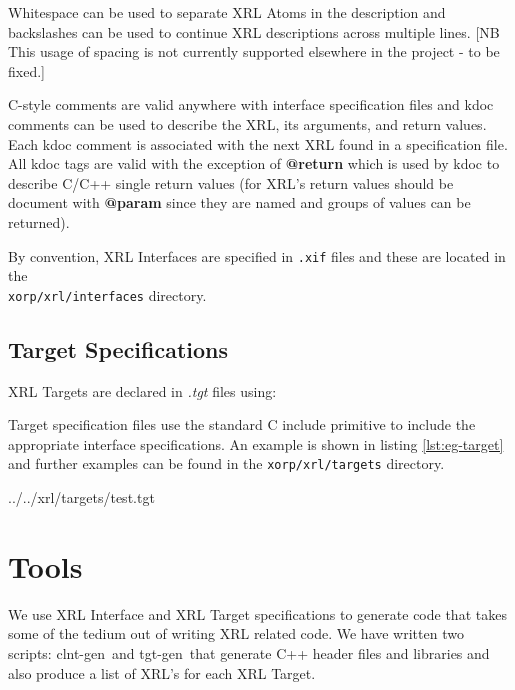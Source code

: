 \documentclass[11pt]{article}
\newcommand{\clntgen}{{\sf clnt-gen}~}
\newcommand{\tgtgen}{{\sf tgt-gen}~}
\begin{document}
 

Whitespace can be used to separate XRL Atoms in the description and
backslashes can be used to continue XRL descriptions across multiple
lines.  [NB This usage of spacing is not currently supported
elsewhere in the project - to be fixed.]

C-style comments are valid anywhere with interface specification files
and kdoc comments can be used to describe the XRL, its arguments, and
return values.  Each kdoc comment is associated with the next XRL
found in a specification file.  All kdoc tags are valid with the
exception of \textbf{@return} which is used by kdoc to describe C/C++
single return values (for XRL's return values should be document with
\textbf{@param} since they are named and groups of values can be
returned).

By convention, XRL Interfaces are specified in \texttt{.xif} files and these
are located in the \\
\texttt{xorp/xrl/interfaces} directory.

\subsection{Target Specifications}

XRL Targets are declared in \textit{.tgt} files using:

\smallskip
\noindent{}

\smallskip Target specification files use the standard C include
primitive to include the appropriate interface specifications.  An
example is shown in listing \ref{lst:eg-target} and further examples
can be found in the \texttt{xorp/xrl/targets} directory.

%
{../../xrl/targets/test.tgt}

\section{Tools}

We use XRL Interface and XRL Target specifications to generate code
that takes some of the tedium out of writing XRL related code.  We
have written two scripts: \clntgen and \tgtgen that
generate C++ header files and libraries and also produce a list of
XRL's for each XRL Target.
\end{document}
